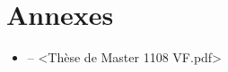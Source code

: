 \appendix
\chapter{Annexes}

\begin{itemize}
\item \thLeite -- <Thèse de Master 1108 VF.pdf>
\end{itemize}
